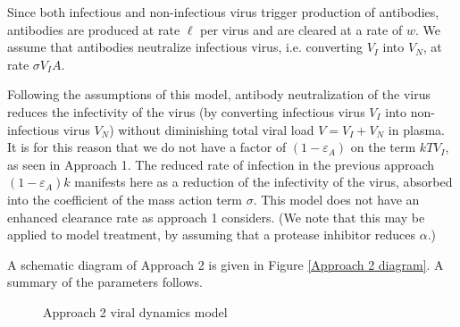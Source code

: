\documentclass[]{elsarticle}
\theoremstyle{definition}
\begin{document}
Since both infectious and non-infectious virus trigger production of antibodies, antibodies are produced at rate $\ell$ per virus and are cleared at a rate of $w$. We assume that antibodies neutralize infectious virus, i.e. converting $V_I$ into $V_N$, at rate $\sigma V_I A$.

Following the assumptions of this model, antibody neutralization of the virus reduces the infectivity of the virus (by converting infectious virus $V_I$ into non-infectious virus $V_N$) without diminishing total viral load $V = V_I + V_N$ in plasma. It is for this reason that we do not have a factor of $\left(1 - \varepsilon_A\right)$ on the term $kTV_I$, as seen in Approach 1. The reduced rate of infection in the previous approach $(1 - \varepsilon_A) k$ manifests here as a reduction of the infectivity of the virus, absorbed into the coefficient of the mass action term $\sigma$. This model does not have an enhanced clearance rate as approach 1 considers. (We note that this may be applied to model treatment, by assuming that a protease inhibitor reduces $\alpha$.)

A schematic diagram of Approach 2 is given in Figure \ref{Approach 2 diagram}. A summary of the parameters follows.

\begin{figure}[H]
\begin{center}
\end{center}
	\caption{Approach 2 viral dynamics model}
	\label{Approach II diagram}
\end{figure}
\end{document}
